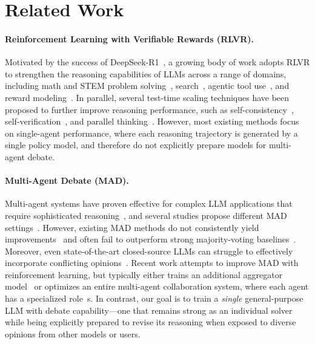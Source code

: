 \section{Related Work}
\label{related_work}

\paragraph{Reinforcement Learning with Verifiable Rewards (RLVR).}
Motivated by the success of DeepSeek-R1~\cite{guo2025deepseek}, a growing body of work adopts RLVR to strengthen the reasoning capabilities of LLMs across a range of domains, including math and STEM problem solving~\cite{wang2025beyond, liu2025prorl}, search~\cite{jin2025search, chen2025learning}, agentic tool use~\cite{qian2025toolrl,zhang2025nemotron}, and reward modeling~\cite{chen2025rm, wang2025llava,guo2025reward}. In parallel, several test-time scaling techniques have been proposed to further improve reasoning performance, such as self-consistency~\cite{wang2022self}, self-verification~\cite{zhang2025incentivizing,liu2025trust}, and parallel thinking~\cite{zheng2025parallel}. However, most existing methods focus on single-agent performance, where each reasoning trajectory is generated by a single policy model, and therefore do not explicitly prepare models for multi-agent debate.

\paragraph{Multi-Agent Debate (MAD).}
Multi-agent systems have proven effective for complex LLM applications that require sophisticated reasoning~\cite{talebirad2023multi,li2024survey,han2024llm,xiong2025multi}, and several studies propose different MAD settings~\cite{du2023improving,liang2024encouraging,liu2024groupdebate,smit2023should}. However, existing MAD methods do not consistently yield improvements~\cite{smit2023should,ma2025judging} and often fail to outperform strong majority-voting baselines~\cite{choi2025debate}. Moreover, even state-of-the-art closed-source LLMs can struggle to effectively incorporate conflicting opinions~\cite{kumaran2025overconfidence,li2025off}. Recent work attempts to improve MAD with reinforcement learning, but typically either trains an additional aggregator model~\cite{qi2025learning,zhao2025majority} or optimizes an entire multi-agent collaboration system, where each agent has a specialized role~\cite{liao2025marft,liu2025llm,marti2025,liu2025spiral}s. In contrast, our goal is to train a \emph{single} general-purpose LLM with debate capability—one that remains strong as an individual solver while being explicitly prepared to revise its reasoning when exposed to diverse opinions from other models or users.
